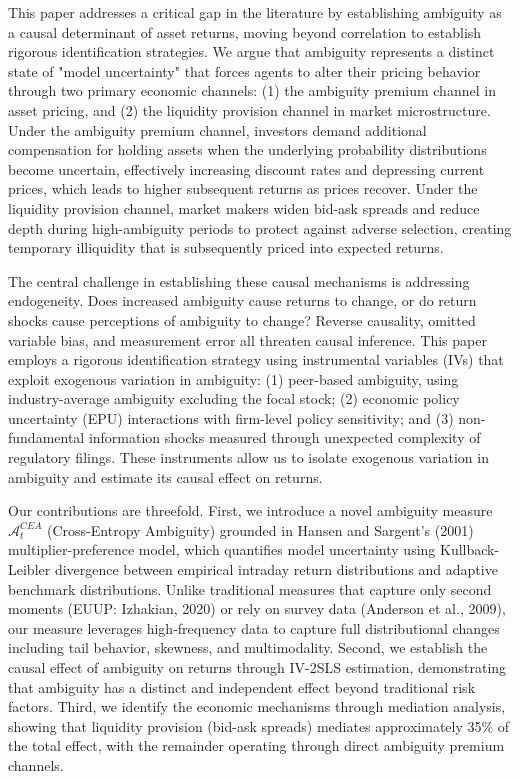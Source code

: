 \documentclass[preprint,12pt,authoryear]{elsarticle}
\begin{document}
This paper addresses a critical gap in the literature by establishing ambiguity as a causal determinant of asset returns, moving beyond correlation to establish rigorous identification strategies. We argue that ambiguity represents a distinct state of "model uncertainty" that forces agents to alter their pricing behavior through two primary economic channels: (1) the ambiguity premium channel in asset pricing, and (2) the liquidity provision channel in market microstructure. Under the ambiguity premium channel, investors demand additional compensation for holding assets when the underlying probability distributions become uncertain, effectively increasing discount rates and depressing current prices, which leads to higher subsequent returns as prices recover. Under the liquidity provision channel, market makers widen bid-ask spreads and reduce depth during high-ambiguity periods to protect against adverse selection, creating temporary illiquidity that is subsequently priced into expected returns.

The central challenge in establishing these causal mechanisms is addressing endogeneity. Does increased ambiguity cause returns to change, or do return shocks cause perceptions of ambiguity to change? Reverse causality, omitted variable bias, and measurement error all threaten causal inference. This paper employs a rigorous identification strategy using instrumental variables (IVs) that exploit exogenous variation in ambiguity: (1) peer-based ambiguity, using industry-average ambiguity excluding the focal stock; (2) economic policy uncertainty (EPU) interactions with firm-level policy sensitivity; and (3) non-fundamental information shocks measured through unexpected complexity of regulatory filings. These instruments allow us to isolate exogenous variation in ambiguity and estimate its causal effect on returns.

Our contributions are threefold. First, we introduce a novel ambiguity measure $\mathcal{A}^{CEA}_t$ (Cross-Entropy Ambiguity) grounded in Hansen and Sargent's (2001) multiplier-preference model, which quantifies model uncertainty using Kullback-Leibler divergence between empirical intraday return distributions and adaptive benchmark distributions. Unlike traditional measures that capture only second moments (EUUP: Izhakian, 2020) or rely on survey data (Anderson et al., 2009), our measure leverages high-frequency data to capture full distributional changes including tail behavior, skewness, and multimodality. Second, we establish the causal effect of ambiguity on returns through IV-2SLS estimation, demonstrating that ambiguity has a distinct and independent effect beyond traditional risk factors. Third, we identify the economic mechanisms through mediation analysis, showing that liquidity provision (bid-ask spreads) mediates approximately 35\% of the total effect, with the remainder operating through direct ambiguity premium channels.
\end{document}
